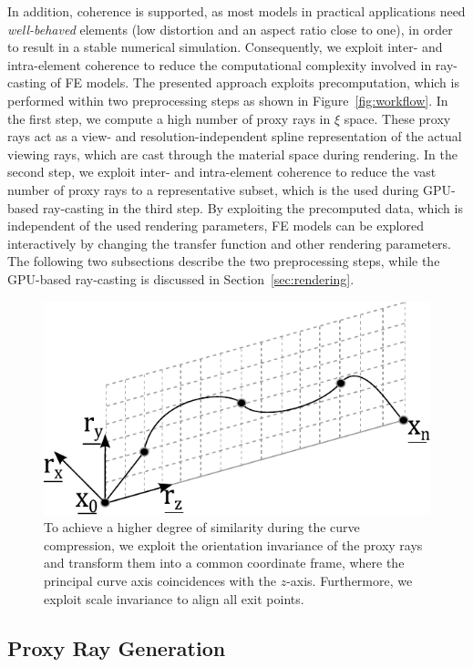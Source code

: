 \documentclass[review,journal]{vgtc}         %
\begin{document}
\noindent In addition, coherence is supported, as most models in practical applications need {\it well-behaved} elements (low distortion and an aspect ratio close to one), in order to result in a stable numerical simulation. Consequently, we exploit inter- and intra-element coherence to reduce the computational complexity involved in ray-casting of FE models. The presented approach exploits precomputation, which is performed within two preprocessing steps as shown in Figure~\ref{fig:workflow}. In the first step, we compute a high number of proxy rays in $\xi$ space. These proxy rays act as a view- and resolution-independent spline representation of the actual viewing rays, which are cast through the material space during rendering. In the second step, we exploit inter- and intra-element coherence to reduce the vast number of proxy rays to a representative subset, which is the used during GPU-based ray-casting in the third step. By exploiting the precomputed data, which is independent of the used rendering parameters, FE models can be explored interactively by changing the transfer function and other rendering parameters. The following two subsections describe the two preprocessing steps, while the GPU-based ray-casting is discussed in Section~\ref{sec:rendering}.

\begin{figure}[b]
	\centering
	\includegraphics[width=0.75\linewidth]{figures/splinetransformation}
	\caption{To achieve a higher degree of similarity during the curve compression, we exploit the orientation invariance of the proxy rays and transform them into a common coordinate frame, where the principal curve axis coincidences with the $z$-axis. Furthermore, we exploit scale invariance to align all exit points.}
	\label{fig:proxyrayalignment}
\end{figure}
\subsection{Proxy Ray Generation}\label{subsec:proxyraygeneration}
\end{document}
